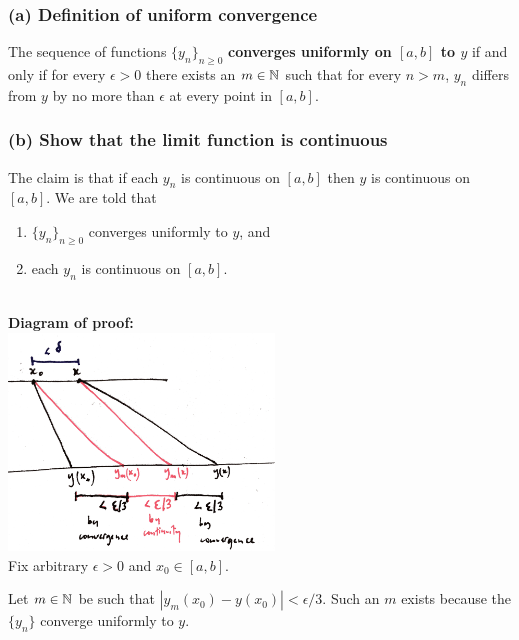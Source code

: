 \documentclass[12pt]{article}
\begin{document}
\begin{mdframed}
  \subsubsection*{(a) Definition of uniform convergence}
  The sequence of functions $\{y_n\}_{n\geq 0}$ \textbf{converges uniformly on
    $[a, b]$ to $y$} if and only if for every $\epsilon > 0$ there exists an
  $m \in \mathbb{N}$ such that for every $n > m$, $y_n$ differs from $y$ by no more
  than $\epsilon$ at every point in $[a,b]$.

  \subsubsection*{(b) Show that the limit function is continuous}

  The claim is that if each $y_n$ is continuous on $[a,b]$ then $y$ is
  continuous on $[a,b]$. We are told that
  \begin{enumerate}
  \item $\{y_n\}_{n \geq 0}$ converges uniformly to $y$, and
  \item each $y_n$ is continuous on $[a,b]$.
  \end{enumerate}
  ~\\
  \textbf{Diagram of proof:}\\
  \includegraphics[width=200pt]{img/differential-equations-a1-1-1-a-diagram.png}\\


  Fix arbitrary $\epsilon > 0$ and $x_0 \in [a,b]$.

  Let $m \in \mathbb{N}$ be such that $|y_m(x_0) - y(x_0)| < \epsilon/3$. Such an $m$
  exists because the $\{y_n\}$ converge uniformly to $y$.


\end{mdframed}
\end{document}
